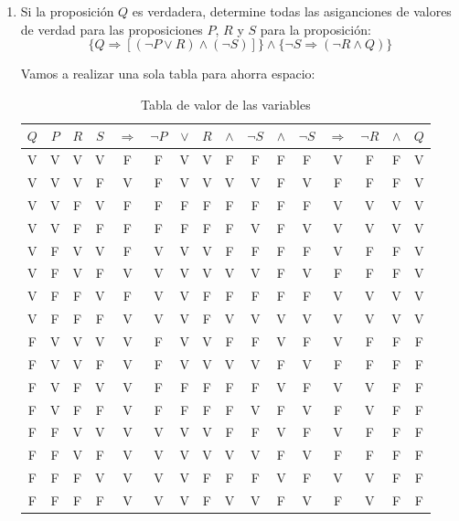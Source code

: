 \documentclass[12pt]{article}
\begin{document}
\begin{enumerate}[label=\alph*)]
    \item Si la proposición $Q$ es verdadera, determine todas las asiganciones de valores de
    verdad para las proposiciones $P$, $R$ y $S$ para la proposición:
    \[\{Q \Longrightarrow [(\neg P \lor R) \land (\neg S)]\} \land \{\neg S \Longrightarrow (\neg R \land Q)\}\]
    
    Vamos a realizar una sola tabla para ahorra espacio:
    \begin{table}[h!]
        \centering
        \begin{tabular}{|c|c|c|c|||c|||c|c|c||c||c||||c||||c|||c|||c|c|c|}
            \hline
            $Q$ & $P$ & $R$ & $S$ & $\Longrightarrow$ & $\neg P$ & $\lor$ & $R$ & $\land$ & $\neg S$ & $\land$ & $\neg S$ & $\Longrightarrow$ & $\neg R$ & $\land$ & $Q$\\
            \hline
            V & V & V & V & F & F & V & V & F & F & F & F & V & F & F & V\\
            V & V & V & F & V & F & V & V & V & V & F & V & F & F & F & V\\
            V & V & F & V & F & F & F & F & F & F & F & F & V & V & V & V\\
            V & V & F & F & F & F & F & F & F & V & F & V & V & V & V & V\\
            V & F & V & V & F & V & V & V & F & F & F & F & V & F & F & V\\
            V & F & V & F & V & V & V & V & V & V & F & V & F & F & F & V\\
            V & F & F & V & F & V & V & F & F & F & F & F & V & V & V & V\\
            V & F & F & F & V & V & V & F & V & V & V & V & V & V & V & V\\
            F & V & V & V & V & F & V & V & F & F & V & F & V & F & F & F\\
            F & V & V & F & V & F & V & V & V & V & F & V & F & F & F & F\\
            F & V & F & V & V & F & F & F & F & F & V & F & V & V & F & F\\
            F & V & F & F & V & F & F & F & F & V & F & V & F & V & F & F\\
            F & F & V & V & V & V & V & V & F & F & V & F & V & F & F & F\\
            F & F & V & F & V & V & V & V & V & V & F & V & F & F & F & F\\
            F & F & F & V & V & V & V & F & F & F & V & F & V & V & F & F\\
            F & F & F & F & V & V & V & F & V & V & F & V & F & V & F & F\\
            \hline           
        \end{tabular}
        \caption{Tabla de valor de las variables}
    \end{table}
    
\end{enumerate}
\end{document}
